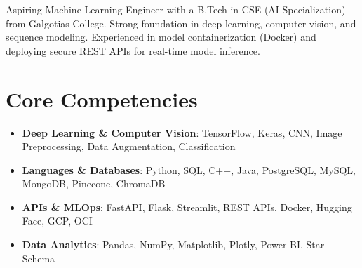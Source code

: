\documentclass[11pt,a4paper,sans]{moderncv}
\begin{document}
\makecvtitle

\vspace{6pt}
\small{Aspiring Machine Learning Engineer with a B.Tech in CSE (AI Specialization) from Galgotias College. Strong foundation in deep learning, computer vision, and sequence modeling. Experienced in model containerization (Docker) and deploying secure REST APIs for real-time model inference.}

\section{Core Competencies}
\vspace{1pt}
\begin{itemize}
\item \textbf{Deep Learning \& Computer Vision}: TensorFlow, Keras, CNN, Image Preprocessing, Data Augmentation, Classification
\item \textbf{Languages \& Databases}: Python, SQL, C++, Java, PostgreSQL, MySQL, MongoDB, Pinecone, ChromaDB
\item \textbf{APIs \& MLOps}: FastAPI, Flask, Streamlit, REST APIs, Docker, Hugging Face, GCP, OCI
\item \textbf{Data Analytics}: Pandas, NumPy, Matplotlib, Plotly, Power BI, Star Schema
\end{itemize}
\end{document}
